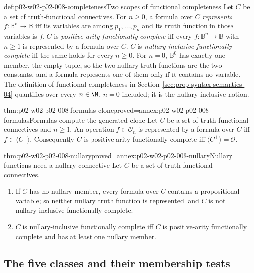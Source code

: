 \begin{hbdefinition}{def:p02-w02-p02-008-completeness}{Two scopes of functional completeness}
Let \(C\) be a set of truth-functional connectives.  For \(n\geq0\), a formula
over \(C\) \emph{represents} \(f:\mathbb B^n\to\mathbb B\) iff its variables
are among \(p_1,\ldots,p_n\) and its truth function in those variables is
\(f\).  \(C\) is \emph{positive-arity functionally complete} iff every
\(f:\mathbb B^n\to\mathbb B\) with \(n\geq1\) is represented by a formula
over \(C\).  \(C\) is \emph{nullary-inclusive functionally complete} iff the
same holds for every \(n\geq0\).  For \(n=0\), \(\mathbb B^0\) has exactly
one member, the empty tuple, so the two nullary truth functions are the two
constants, and a formula represents one of them only if it contains no
variable.  The definition of functional completeness in
Section~\ref{sec:prop-syntax-semantics-04} quantifies over every
\(n\in\N\), \(n=0\) included; it is the nullary-inclusive notion.
\end{hbdefinition}

\begin{hbtheorem}{thm:p02-w02-p02-008-formulas-clone}{proved=annex:p02-w02-p02-008-formulas}{Formulas compute the generated clone}
Let \(C\) be a set of truth-functional connectives and \(n\geq1\).  An
operation \(f\in\mathcal O_n\) is represented by a formula over \(C\) iff
\(f\in\langle C^+\rangle\).  Consequently \(C\) is positive-arity
functionally complete iff \(\langle C^+\rangle=\mathcal O\).
\end{hbtheorem}

\begin{hbtheorem}{thm:p02-w02-p02-008-nullary}{proved=annex:p02-w02-p02-008-nullary}{Nullary functions need a nullary connective}
Let \(C\) be a set of truth-functional connectives.
\begin{enumerate}
\item If \(C\) has no nullary member, every formula over \(C\) contains a
  propositional variable; so neither nullary truth function is represented,
  and \(C\) is not nullary-inclusive functionally complete.
\item \(C\) is nullary-inclusive functionally complete iff \(C\) is
  positive-arity functionally complete and has at least one nullary member.
\end{enumerate}
\end{hbtheorem}

\subsection{The five classes and their membership tests}
\label{sec:p02-w02-p02-008-classes}

